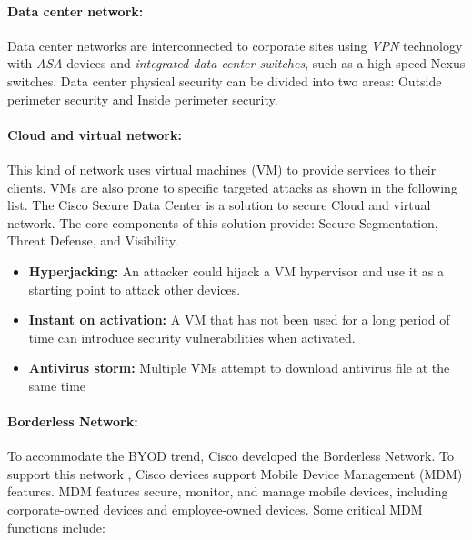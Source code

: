 \paragraph{Data center network:} Data center networks are interconnected to corporate sites using \emph{VPN} technology with \emph{ASA} devices and \emph{integrated data center switches}, such as a high-speed Nexus switches. Data center physical security can be divided into two areas: Outside perimeter security and Inside perimeter security. 

\paragraph{Cloud and virtual network:} This kind of network uses virtual machines (VM) to provide services to their clients.  VMs are also prone to specific targeted attacks as shown in the following list. The Cisco Secure Data Center is a solution to secure Cloud and virtual network. The core components of this solution provide: Secure Segmentation, Threat Defense, and Visibility.

\begin{itemize}
\item \textbf{Hyperjacking:} An attacker could hijack a VM hypervisor and use it as a starting point to attack other devices.
\item \textbf{Instant on activation:} A VM that has not been used for a long period of time can introduce security vulnerabilities when activated.
\item \textbf{Antivirus storm:} Multiple VMs attempt to download antivirus file at the same time
\end{itemize}

\paragraph{Borderless Network:} To accommodate the BYOD trend, Cisco developed the Borderless Network. To support this network , Cisco devices support Mobile Device Management (MDM) features. MDM features secure, monitor, and manage mobile devices, including corporate-owned devices and employee-owned devices. Some critical MDM functions include:

